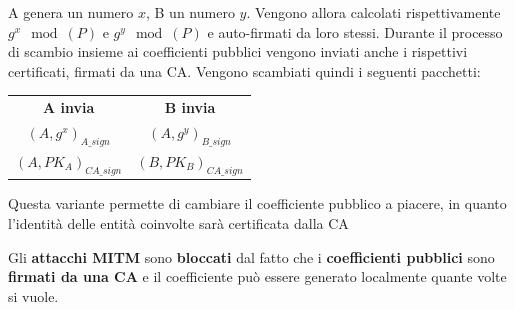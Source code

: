 \begin{definition}[Ephimeral DH]\label{def:ephdh}
A genera un numero $x$, B un numero $y$. Vengono allora calcolati rispettivamente $g^x\mod(P)$ e $g^y\mod(P)$ e auto-firmati da loro stessi.
Durante il processo di scambio insieme ai coefficienti pubblici vengono inviati anche i rispettivi certificati, firmati da una CA. Vengono scambiati quindi i seguenti pacchetti:
\begin{table}[H]
    \centering
    \begin{tabular}{c c}
         \textbf{A invia}& \textbf{B invia} \\
        $(A, g^x)_{A\_sign}$ & $(A, g^y)_{B\_sign}$ \\
         $(A, PK_A)_{CA\_sign}$&$(B, PK_B)_{CA\_sign}$
    \end{tabular}
\end{table}
\begin{remark}
Questa variante permette di cambiare il coefficiente pubblico a piacere, in quanto l'identità delle entità coinvolte sarà certificata dalla CA
\end{remark}
\end{definition}
\begin{corollary}
Gli \textbf{attacchi MITM} sono \textbf{bloccati} dal fatto che i \textbf{coefficienti pubblici} sono \textbf{firmati da una CA} e il coefficiente può essere generato localmente quante volte si vuole. 
\end{corollary}
